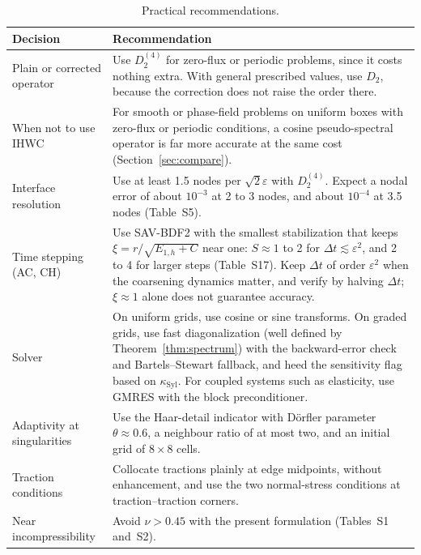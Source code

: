 \documentclass[smallextended,envcountsame]{svjour3}
\begin{document}
\begin{table}[t]\centering\footnotesize
\caption{Practical recommendations.}\label{tab:guide}
\begin{tabular}{p{}p{}}
\toprule
Decision & Recommendation\\
\midrule
Plain or corrected operator & Use $D_2^{(4)}$ for zero-flux or periodic problems, since it costs nothing extra. With general prescribed values, use $D_2$, because the correction does not raise the order there.\\
When not to use IHWC & For smooth or phase-field problems on uniform boxes with zero-flux or periodic conditions, a cosine pseudo-spectral operator is far more accurate at the same cost (Section~\ref{sec:compare}).\\
Interface resolution & Use at least 1.5 nodes per $\sqrt2\varepsilon$ with $D_2^{(4)}$. Expect a nodal error of about $10^{-3}$ at 2 to 3 nodes, and about $10^{-4}$ at 3.5 nodes (Table~S5).\\
Time stepping (AC, CH) & Use SAV-BDF2 with the smallest stabilization that keeps $\xi=r/\sqrt{E_{1,h}+C}$ near one: $S\approx1$ to 2 for $\Delta t\lesssim\varepsilon^2$, and 2 to 4 for larger steps (Table~S17). Keep $\Delta t$ of order $\varepsilon^2$ when the coarsening dynamics matter, and verify by halving $\Delta t$; $\xi\approx1$ alone does not guarantee accuracy.\\
Solver & On uniform grids, use cosine or sine transforms. On graded grids, use fast diagonalization (well defined by Theorem~\ref{thm:spectrum}) with the backward-error check and Bartels--Stewart fallback, and heed the sensitivity flag based on $\kappa_{\mathrm{Syl}}$. For coupled systems such as elasticity, use GMRES with the block preconditioner.\\
Adaptivity at singularities & Use the Haar-detail indicator with D\"orfler parameter $\theta\approx0.6$, a neighbour ratio of at most two, and an initial grid of $8\times8$ cells.\\
Traction conditions & Collocate tractions plainly at edge midpoints, without enhancement, and use the two normal-stress conditions at traction--traction corners.\\
Near incompressibility & Avoid $\nu>0.45$ with the present formulation (Tables~S1 and~S2).\\
\bottomrule
\end{tabular}
\end{table}

\end{document}
